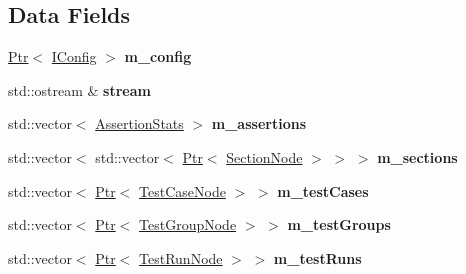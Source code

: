 \subsection*{Data Fields}
\begin{DoxyCompactItemize}
\item 
\hyperlink{classCatch_1_1Ptr}{Ptr}$<$ \hyperlink{structCatch_1_1IConfig}{I\+Config} $>$ {\bfseries m\+\_\+config}\hypertarget{structCatch_1_1CumulativeReporterBase_a19a52c03908bdc2f781a99d844f07c8e}{}\label{structCatch_1_1CumulativeReporterBase_a19a52c03908bdc2f781a99d844f07c8e}

\item 
std\+::ostream \& {\bfseries stream}\hypertarget{structCatch_1_1CumulativeReporterBase_add96a41a3e449be82c629a9cefc84aac}{}\label{structCatch_1_1CumulativeReporterBase_add96a41a3e449be82c629a9cefc84aac}

\item 
std\+::vector$<$ \hyperlink{structCatch_1_1AssertionStats}{Assertion\+Stats} $>$ {\bfseries m\+\_\+assertions}\hypertarget{structCatch_1_1CumulativeReporterBase_acb33a9784c0e8c0b8d477dff96ed36cb}{}\label{structCatch_1_1CumulativeReporterBase_acb33a9784c0e8c0b8d477dff96ed36cb}

\item 
std\+::vector$<$ std\+::vector$<$ \hyperlink{classCatch_1_1Ptr}{Ptr}$<$ \hyperlink{structCatch_1_1CumulativeReporterBase_1_1SectionNode}{Section\+Node} $>$ $>$ $>$ {\bfseries m\+\_\+sections}\hypertarget{structCatch_1_1CumulativeReporterBase_ad88d6066ef6c5ef1f02f64a41672d259}{}\label{structCatch_1_1CumulativeReporterBase_ad88d6066ef6c5ef1f02f64a41672d259}

\item 
std\+::vector$<$ \hyperlink{classCatch_1_1Ptr}{Ptr}$<$ \hyperlink{structCatch_1_1CumulativeReporterBase_1_1Node}{Test\+Case\+Node} $>$ $>$ {\bfseries m\+\_\+test\+Cases}\hypertarget{structCatch_1_1CumulativeReporterBase_aabb351de73df367d80ec12734997448c}{}\label{structCatch_1_1CumulativeReporterBase_aabb351de73df367d80ec12734997448c}

\item 
std\+::vector$<$ \hyperlink{classCatch_1_1Ptr}{Ptr}$<$ \hyperlink{structCatch_1_1CumulativeReporterBase_1_1Node}{Test\+Group\+Node} $>$ $>$ {\bfseries m\+\_\+test\+Groups}\hypertarget{structCatch_1_1CumulativeReporterBase_a39db5cc0dc6646aa42f20b2b981b9ae5}{}\label{structCatch_1_1CumulativeReporterBase_a39db5cc0dc6646aa42f20b2b981b9ae5}

\item 
std\+::vector$<$ \hyperlink{classCatch_1_1Ptr}{Ptr}$<$ \hyperlink{structCatch_1_1CumulativeReporterBase_1_1Node}{Test\+Run\+Node} $>$ $>$ {\bfseries m\+\_\+test\+Runs}\hypertarget{structCatch_1_1CumulativeReporterBase_abbcd7bb9f8ec2dff8520c2d04df1e6ce}{}\label{structCatch_1_1CumulativeReporterBase_abbcd7bb9f8ec2dff8520c2d04df1e6ce}


\end{DoxyCompactItemize}
